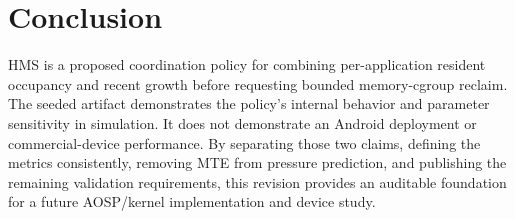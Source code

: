 \section{Conclusion}
HMS is a proposed coordination policy for combining per-application resident
occupancy and recent growth before requesting bounded memory-cgroup reclaim.  The
seeded artifact demonstrates the policy's internal behavior and parameter
sensitivity in simulation.  It does not demonstrate an Android deployment or
commercial-device performance.  By separating those two claims, defining the
metrics consistently, removing MTE from pressure prediction, and publishing the
remaining validation requirements, this revision provides an auditable foundation
for a future AOSP/kernel implementation and device study.
